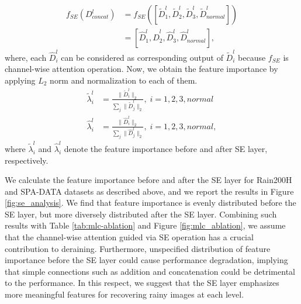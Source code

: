 \documentclass[a4paper,fleqn]{cas-dc}
\begin{document}
\begin{align}
    f_{SE}(D_{concat}^l) &=  f_{SE}( [\tilde{D}_{1}^l , \tilde{D}_{2}^l, \tilde{D}_{3}^l , \tilde{D}_{normal}^l] ) \\
    &= [\hat{D}_{1}^l , \hat{D}_{2}^l, \hat{D}_{3}^l , \hat{D}_{normal}^l], 
\end{align} 
where, each $\hat{D}_{i}^l$ can be considered as corresponding output of $\tilde{D}_{i}^l$ because $f_{SE}$ is channel-wise attention operation. Now, we obtain the feature importance by applying $L_2$ norm and normalization to each of them. 
\begin{align}
    \tilde{\lambda}_i^l &=  \frac{\| \tilde{D}_{i}^l \|_2 }{\sum_j \| \tilde{D}_{j}^l \|_2  } , \; i = 1,2,3,normal  \\ \hat{\lambda}_i^l &=  \frac{\| \hat{D}_{i}^l \|_2 }{\sum_j \| \hat{D}_{j}^l \|_2  }  , \; i = 1,2,3,normal,
\end{align}
where $\tilde{\lambda}_i^l$ and $\hat{\lambda}_i^l$ denote the feature importance before and after SE layer, respectively. 

We calculate the feature importance before and after the SE layer for Rain200H and SPA-DATA datasets as described above, and we report the results in Figure \ref{fig:se_analysis}. We find that feature importance is evenly distributed before the SE layer, but more diversely distributed after the SE layer. Combining such results with Table \ref{tab:mlc-ablation} and Figure \ref{fig:mlc_ablation}, we assume that the channel-wise attention guided via SE operation has a crucial contribution to deraining. Furthermore, unspecified distribution of feature importance before the SE layer could cause performance degradation, implying that simple connections such as addition and concatenation could be detrimental to the performance. In this respect, we suggest that the SE layer emphasizes more meaningful features for recovering rainy images at each level.
\end{document}

